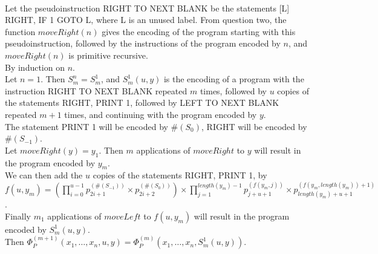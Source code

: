 \documentclass{assignment}
\begin{document}
\begin{problemlist}
  \clearpage
  \pbitem
  \begin{problem}
  \end{problem}
  \begin{answer}
    \\
    Let the pseudoinstruction RIGHT TO NEXT BLANK be the statements [L] RIGHT, IF 1 GOTO L, where L is an unused label. From question two, the function $moveRight(n)$ gives the encoding of the program starting with this pseudoinstruction, followed by the instructions of the program encoded by $n$, and $moveRight(n)$ is primitive recursive.\\

    By induction on $n$.\\
    Let $n=1$. Then $S_m^n=S_m^1$, and $S_m^1(u,y)$ is the encoding of a program with the instruction RIGHT TO NEXT BLANK repeated $m$ times, followed by $u$ copies of the statements RIGHT, PRINT 1, followed by LEFT TO NEXT BLANK repeated $m+1$ times, and continuing with the program encoded by $y$.\\
    The statement PRINT 1 will be encoded by $\#(S_{0})$, RIGHT will be encoded by $\#(S_{-1})$.\\
    Let $moveRight(y)=y_1$. Then $m$ applications of $moveRight$ to $y$ will result in the program encoded by $y_m$.\\
    We can then add the $u$ copies of the statements RIGHT, PRINT 1, by $f(u,y_m)=(\prod_{i=0}^{u-1}p_{2i+1}^{(\#(S_{-1}))}\times p_{2i+2}^{(\#(S_0))})\times \prod_{j=1}^{length(y_m)-1}p_{j+u+1}^{(f(y_m,j))} \times p_{length(y_m)+u+1}^{(f(y_m,length(y_m))+1)}$.\\
    Finally $m_1$ applications of $moveLeft$ to $f(u,y_m)$ will result in the program encoded by $S_m^1(u,y)$.\\
    Then $\Phi_P^{(m+1)}(x_1,\ldots,x_n,u,y)=\Phi_P^{(m)}(x_1,\ldots,x_n,S_m^1(u,y))$.\\


\end{answer}
\end{problemlist}
\end{document}
